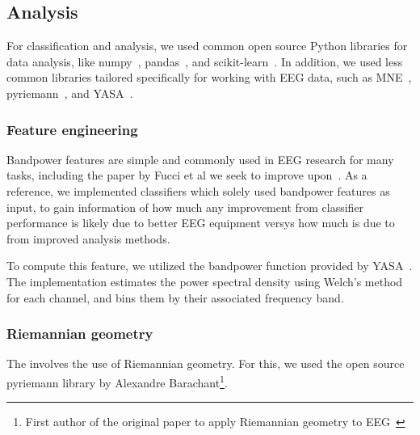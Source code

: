 \documentclass[a4paper]{article}
\begin{document}
\begin{refsection}
    \subsection{Analysis}

        For classification and analysis, we used common open source Python libraries for data analysis, like numpy~\cite{harris2020array}, pandas~\cite{reback2020pandas}, and scikit-learn~\cite{scikit-learn}. In addition, we used less common libraries tailored specifically for working with EEG data, such as MNE~\cite{noauthor_mne-toolsmne-python_2020}, pyriemann~\cite{alexandre_barachant_2020_3715511}, and YASA~\cite{raphael_vallat_raphaelvallatyasa_2020}.

        \subsubsection{Feature engineering}

            Bandpower features are simple and commonly used in EEG research for many tasks, including the paper by Fucci et al we seek to improve upon~\cite{fucci_replication_2019}. As a reference, we implemented classifiers which solely used bandpower features as input, to gain information of how much any improvement from classifier performance is likely due to better EEG equipment versys how much is due to from improved analysis methods.

            To compute this feature, we utilized the bandpower function provided by YASA~\cite{raphael_vallat_raphaelvallatyasa_2020}. The implementation estimates the power spectral density using Welch's method for each channel, and bins them by their associated frequency band.

        \subsubsection{Riemannian geometry}

            The  involves the use of Riemannian geometry. For this, we used the open source pyriemann library by Alexandre Barachant\footnote{First author of the original paper to apply Riemannian geometry to EEG~\cite{barachant_classification_2013}}.



\end{refsection}
\end{document}
